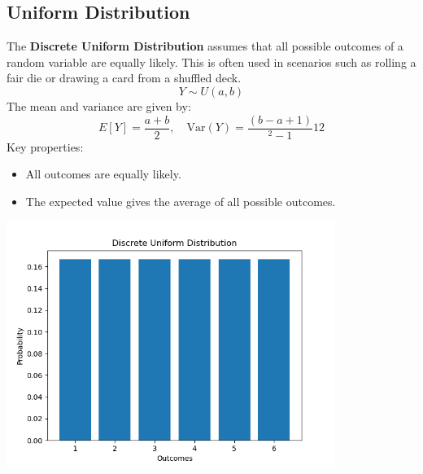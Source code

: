 \documentclass{article}
\begin{document}
\subsection{Uniform Distribution}
The \textbf{Discrete Uniform Distribution} assumes that all possible outcomes of a random variable are equally likely. This is often used in scenarios such as rolling a fair die or drawing a card from a shuffled deck.
\[
Y \sim U(a, b)
\]
The mean and variance are given by:
\[
E[Y] = \frac{a+b}{2}, \quad \text{Var}(Y) = \frac{(b-a+1)}{^2 - 1}{12}
\]
Key properties:
\begin{itemize}
    \item All outcomes are equally likely.
    \item The expected value gives the average of all possible outcomes.
\end{itemize}
\begin{center}
    \includegraphics[width=0.8\textwidth]{./graphs/probDist/uniform_distribution.png}
\end{center}

\newpage
\end{document}
